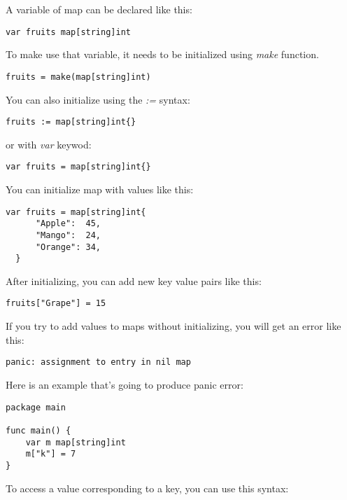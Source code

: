 A variable of map can be declared like this:

\begin{lstlisting}[numbers=none]
var fruits map[string]int
\end{lstlisting}

To make use that variable, it needs to be initialized using \textit{make}
function.

\begin{lstlisting}[numbers=none]
fruits = make(map[string]int)
\end{lstlisting}

You can also initialize using the \textit{:=} syntax:

\begin{lstlisting}[numbers=none]
fruits := map[string]int{}
\end{lstlisting}

or with \textit{var} keywod:

\begin{lstlisting}[numbers=none]
var fruits = map[string]int{}
\end{lstlisting}

You can initialize map with values like this:

\begin{lstlisting}[numbers=none]
var fruits = map[string]int{
      "Apple":  45,
      "Mango":  24,
      "Orange": 34,
  }
\end{lstlisting}

After initializing, you can add new key value pairs like this:

\begin{lstlisting}[numbers=none]
fruits["Grape"] = 15
\end{lstlisting}

If you try to add values to maps without initializing, you will get an error
like this:

\begin{lstlisting}[numbers=none]
panic: assignment to entry in nil map
\end{lstlisting}

Here is an example that's going to produce panic error:

\begin{lstlisting}[numbers=none]
package main

func main() {
	var m map[string]int
	m["k"] = 7
}
\end{lstlisting}

To access a value corresponding to a key, you can use this syntax:

